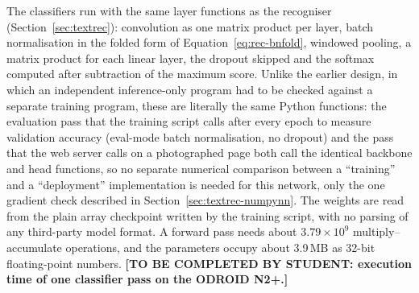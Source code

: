 The classifiers run with the same layer functions as the recogniser (Section~\ref{sec:textrec}): convolution as one matrix product per layer, batch normalisation in the folded form of Equation~\ref{eq:rec-bnfold}, windowed pooling, a matrix product for each linear layer, the dropout skipped and the softmax computed after subtraction of the maximum score.
Unlike the earlier design, in which an independent inference-only program had to be checked against a separate training program, these are literally the same Python functions: the evaluation pass that the training script calls after every epoch to measure validation accuracy (eval-mode batch normalisation, no dropout) and the pass that the web server calls on a photographed page both call the identical backbone and head functions, so no separate numerical comparison between a ``training'' and a ``deployment'' implementation is needed for this network, only the one gradient check described in Section~\ref{sec:textrec-numpynn}.
The weights are read from the plain array checkpoint written by the training script, with no parsing of any third-party model format.
A forward pass needs about $3.79\times10^9$ multiply--accumulate operations, and the parameters occupy about 3.9\,MB as 32-bit floating-point numbers.
\textbf{[TO BE COMPLETED BY STUDENT: execution time of one classifier pass on the ODROID N2+.]}
